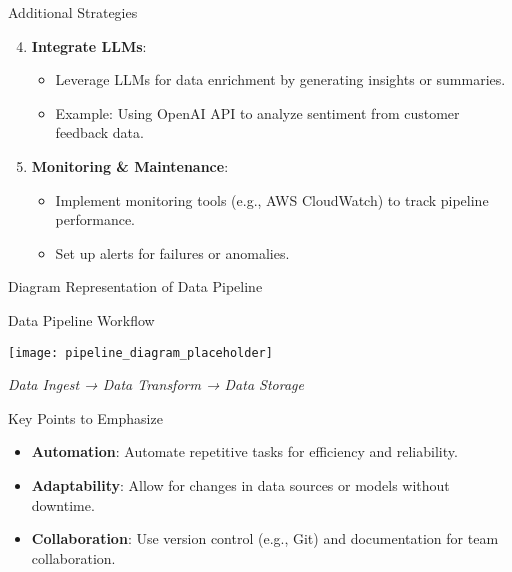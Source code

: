 \documentclass[aspectratio=169]{beamer}
\begin{document}
\begin{frame}{Additional Strategies}
    \begin{enumerate}
        \setcounter{enumi}{3}
        \item \textbf{Integrate LLMs}:
        \begin{itemize}
            \item Leverage LLMs for data enrichment by generating insights or summaries.
            \item Example: Using OpenAI API to analyze sentiment from customer feedback data.
        \end{itemize}
        
        \item \textbf{Monitoring \& Maintenance}:
        \begin{itemize}
            \item Implement monitoring tools (e.g., AWS CloudWatch) to track pipeline performance.
            \item Set up alerts for failures or anomalies.
        \end{itemize}
    \end{enumerate}
\end{frame}

\begin{frame}{Diagram Representation of Data Pipeline}
    \begin{block}{Data Pipeline Workflow}
        \begin{center}
        \texttt{[image: pipeline\_diagram\_placeholder]} %
        \end{center}
        \textit{Data Ingest → Data Transform → Data Storage}
    \end{block}
\end{frame}

\begin{frame}{Key Points to Emphasize}
    \begin{itemize}
        \item \textbf{Automation}: Automate repetitive tasks for efficiency and reliability.
        \item \textbf{Adaptability}: Allow for changes in data sources or models without downtime.
        \item \textbf{Collaboration}: Use version control (e.g., Git) and documentation for team collaboration.
    \end{itemize}
\end{frame}
\end{document}
